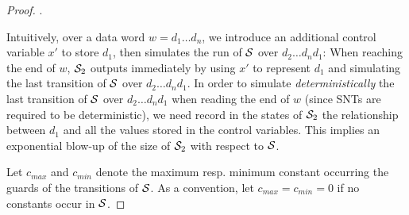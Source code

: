 \begin{appendix}
\begin{proof}
\smallskip

.

Intuitively, over a data word $w=d_1\dots d_n$, we introduce an additional control variable $x'$ to store $d_1$, then simulates the run of ${\mathcal{S} }$ over $d_2\dots d_n d_1$: When reaching the end of $w$, ${\mathcal{S} }_2$ outputs immediately by using $x'$ to represent $d_1$ and simulating the last transition of ${\mathcal{S} }$ over $d_2 \dots d_n d_1$. In order to simulate \emph{deterministically} the last transition of ${\mathcal{S} }$ over $d_2 \dots d_n d_1$ when reading the end of $w$ (since SNTs are required to be deterministic), we need record in the states of ${\mathcal{S} }_2$ the relationship between $d_1$ and all the values stored in the control variables. This implies an exponential blow-up of the size of ${\mathcal{S} }_2$ with respect to ${\mathcal{S} }$.

Let $c_{max}$ and $c_{min}$ denote the maximum resp. minimum constant occurring the guards of the transitions of ${\mathcal{S} }$. As a convention, let $c_{max}=c_{min}=0$ if no constants occur in ${\mathcal{S} }$.


\end{proof}
\end{appendix}
